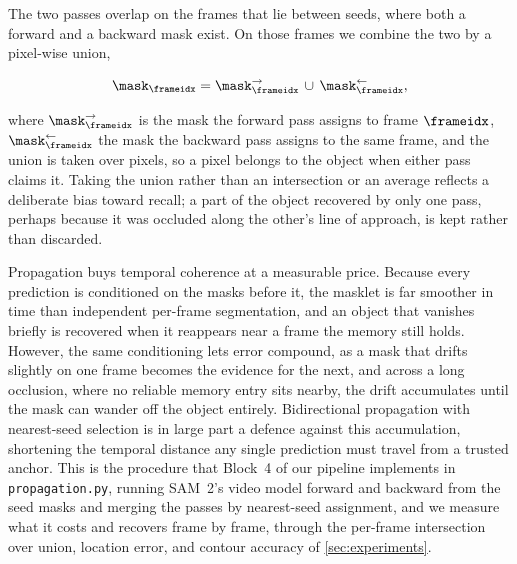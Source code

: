 The two passes overlap on the frames that lie between seeds, where both a forward and a
backward mask exist. On those frames we combine the two by a pixel-wise union,

\begin{equation}
  \mask_\frameidx = \mask^{\rightarrow}_\frameidx \,\cup\, \mask^{\leftarrow}_\frameidx,
  \label{eq:mask-union}
\end{equation}

where $\mask^{\rightarrow}_\frameidx$ is the mask the forward pass assigns to frame
$\frameidx$, $\mask^{\leftarrow}_\frameidx$ the mask the backward pass assigns to the same
frame, and the union is taken over pixels, so a pixel belongs to the object when either
pass claims it. Taking the union rather than an intersection or an average reflects a
deliberate bias toward recall; a part of the object recovered by only one pass, perhaps
because it was occluded along the other's line of approach, is kept rather than discarded.

Propagation buys temporal coherence at a measurable price. Because every prediction is
conditioned on the masks before it, the masklet is far smoother in time than independent
per-frame segmentation, and an object that vanishes briefly is recovered when it
reappears near a frame the memory still holds. However, the same conditioning lets error
compound, as a mask that drifts slightly on one frame becomes the evidence for the next,
and across a long occlusion, where no reliable memory entry sits nearby, the drift
accumulates until the mask can wander off the object entirely. Bidirectional propagation
with nearest-seed selection is in large part a defence against this accumulation,
shortening the temporal distance any single prediction must travel from a trusted anchor.
This is the procedure that Block~4 of our pipeline implements in \texttt{propagation.py},
running SAM~2's video model forward and backward from the seed masks and merging the
passes by nearest-seed assignment, and we measure what it costs and recovers frame by
frame, through the per-frame intersection over union, location error, and contour
accuracy of \cref{sec:experiments}.

